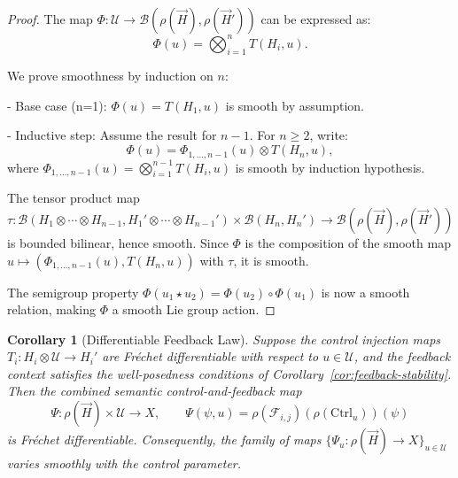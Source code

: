 \documentclass[11pt]{article}
\newtheorem{corollary}{Corollary}
\begin{document}
\begin{proof}
The map \(\Phi: \mathcal{U} \to \mathcal{B}(\rho(\vec{H}), \rho(\vec{H}'))\) can be expressed as:
\[
\Phi(u) = \bigotimes_{i=1}^n T(H_i, u).
\]

We prove smoothness by induction on \(n\):

- Base case (n=1): \(\Phi(u) = T(H_1, u)\) is smooth by assumption.

- Inductive step: Assume the result for \(n-1\). For \(n \geq 2\), write:
\[
\Phi(u) = \Phi_{1,\dots,n-1}(u) \otimes T(H_n, u),
\]
where \(\Phi_{1,\dots,n-1}(u) = \bigotimes_{i=1}^{n-1} T(H_i, u)\) is smooth by induction hypothesis.

The tensor product map
\[
\tau: \mathcal{B}(H_1 \otimes \cdots \otimes H_{n-1}, H_1' \otimes \cdots \otimes H_{n-1}') \times \mathcal{B}(H_n, H_n') \to \mathcal{B}(\rho(\vec{H}), \rho(\vec{H}'))
\]
is bounded bilinear, hence smooth. Since \(\Phi\) is the composition of the smooth map \(u \mapsto (\Phi_{1,\dots,n-1}(u), T(H_n, u))\) with \(\tau\), it is smooth.

The semigroup property \(\Phi(u_1 \star u_2) = \Phi(u_2) \circ \Phi(u_1)\) is now a smooth relation, making \(\Phi\) a smooth Lie group action.
\end{proof}

\begin{corollary}[Differentiable Feedback Law]\label{cor:differentiable-feedback}
Suppose the control injection maps \( T_i: H_i \otimes \mathcal{U} \to H_i' \) are Fr\'echet differentiable with respect to \( u \in \mathcal{U} \), and the feedback context satisfies the well-posedness conditions of Corollary~\ref{cor:feedback-stability}. Then the combined semantic control-and-feedback map
\[
\Psi: \rho(\vec{H}) \times \mathcal{U} \longrightarrow X, 
\qquad 
\Psi(\psi, u) = \rho(\mathcal{F}_{i,j})(\rho(\mathrm{Ctrl}_u))(\psi)
\]
is Fr\'echet differentiable. Consequently, the family of maps \( \{\Psi_u: \rho(\vec{H}) \to X\}_{u \in \mathcal{U}} \) varies smoothly with the control parameter.
\end{corollary}
\end{document}

